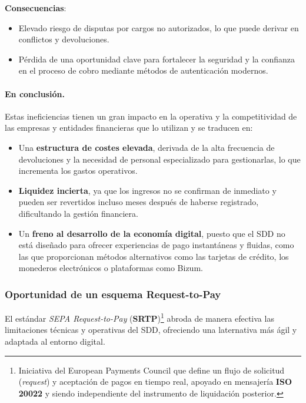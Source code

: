 \begin{enumerate}[label=\textbf{\arabic*.}, leftmargin=0.75cm]
        \textbf{Consecuencias}:
        \begin{itemize}
          \item Elevado riesgo de disputas por cargos no autorizados, lo que puede derivar en conflictos y devoluciones.
          \item Pérdida de una oportunidad clave para fortalecer la seguridad y la confianza en el proceso de cobro mediante métodos de autenticación modernos.
        \end{itemize}
\end{enumerate}

\paragraph{En conclusión.} Estas ineficiencias tienen un gran impacto en la operativa y la competitividad de las empresas y entidades financieras que lo utilizan y se traducen en:

\begin{itemize}[leftmargin=0.45cm]
  \item Una \textbf{estructura de costes elevada}, derivada de la alta frecuencia de devoluciones y la necesidad de personal especializado para gestionarlas, lo que incrementa los gastos operativos.
  \item \textbf{Liquidez incierta}, ya que los ingresos no se confirman de inmediato y pueden ser revertidos incluso meses después de haberse registrado, dificultando la gestión financiera.
  \item Un \textbf{freno al desarrollo de la economía digital}, puesto que el SDD no está diseñado para ofrecer experiencias de pago instantáneas y fluidas, como las que proporcionan métodos alternativos como las tarjetas de crédito, los monederos electrónicos o plataformas como Bizum.
\end{itemize}

\subsubsection{Oportunidad de un esquema Request-to-Pay}
El estándar \textit{SEPA Request-to-Pay} (\textbf{SRTP})\footnote{Iniciativa del European Payments Council que define un flujo de solicitud (\textit{request}) y aceptación de pagos en tiempo real, apoyado en mensajería \textbf{ISO 20022} y siendo independiente del instrumento de liquidación posterior.} abroda de manera efectiva las limitaciones técnicas y operativas del SDD, ofreciendo una laternativa más ágil y adaptada al entorno digital.

